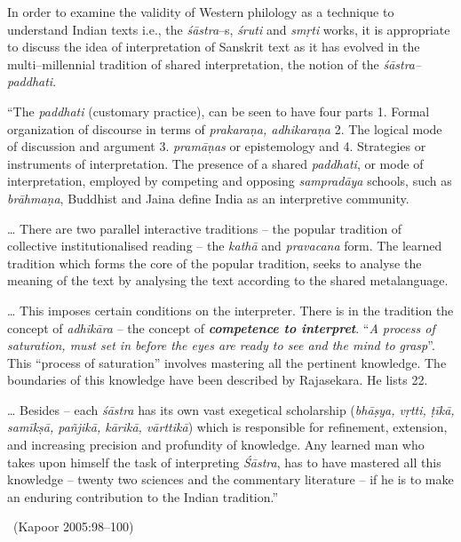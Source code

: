 In order to examine the validity of Western philology as a technique to understand Indian texts i.e., the \textit{śāstra}–s, \textit{śruti} and \textit{smṛti} works, it is appropriate to discuss the idea of interpretation of Sanskrit text as it has evolved in the multi–millennial tradition of shared interpretation, the notion of the \textit{śāstra–paddhati}.

\begin{myquote}
“The \textit{paddhati} (customary practice), can be seen to have four parts 1. Formal organization of discourse in terms of \textit{prakaraṇa, adhikaraṇa} 2. The logical mode of discussion and argument 3. \textit{pramāṇas} or epistemology and 4. Strategies or instruments of interpretation. The presence of a shared \textit{paddhati}, or mode of interpretation, employed by competing and opposing \textit{sampradāya} schools, such as \textit{brāhmaṇa}, Buddhist and Jaina define India as an interpretive community.
\end{myquote}

\begin{myquote}
… There are two parallel interactive traditions – the popular tradition of collective institutionalised reading – the \textit{kathā} and \textit{pravacana} form. The learned tradition which forms the core of the popular tradition, seeks to analyse the meaning of the text by analysing the text according to the shared metalanguage.
\end{myquote}

\begin{myquote}
… This imposes certain conditions on the interpreter. There is in the tradition the concept of \textit{adhikāra} – the concept of \textbf{\textit{competence to interpret}}. “\textit{A process of saturation, must set in before the eyes are ready to see and the mind to grasp}”. This “process of saturation” involves mastering all the pertinent knowledge. The boundaries of this knowledge have been described by Rajasekara. He lists 22.
\end{myquote}

\begin{myquote}
… Besides – each \textit{śāstra} has its own vast exegetical scholarship (\textit{bhāṣya, vṛtti, ṭīkā, samīkṣā, pañjikā, kārikā, vārttikā}) which is responsible for refinement, extension, and increasing precision and profundity of knowledge. Any learned man who takes upon himself the task of interpreting \textit{Śāstra}, has to have mastered all this knowledge – twenty two sciences and the commentary literature – if he is to make an enduring contribution to the Indian tradition.”

~\hfill (Kapoor 2005:98–100)
\end{myquote}

